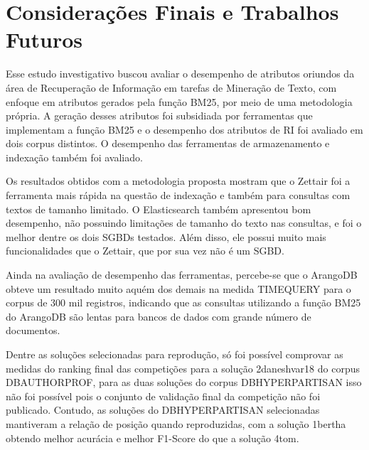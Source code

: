 \chapter{Considerações Finais e Trabalhos Futuros} \label{ch:ConsideraçõesFinais}

Esse estudo investigativo buscou avaliar o desempenho de atributos oriundos da área de Recuperação de Informação em tarefas de Mineração de Texto, com enfoque em atributos gerados pela função BM25, por meio de uma metodologia própria.
A geração desses atributos foi subsidiada por ferramentas que implementam a função BM25 e o desempenho dos atributos de RI foi avaliado em dois corpus distintos.
O desempenho das ferramentas de armazenamento e indexação também foi avaliado.
 
Os resultados obtidos com a metodologia proposta mostram que o Zettair foi a ferramenta mais rápida na questão de indexação e também para consultas com textos de tamanho limitado.
O Elasticsearch também apresentou bom desempenho, não possuindo limitações de tamanho do texto nas consultas, e foi o melhor dentre os dois SGBDs testados.
Além disso, ele possui muito mais funcionalidades que o Zettair, que por sua vez não é um SGBD.

Ainda na avaliação de desempenho das ferramentas, percebe-se que o ArangoDB obteve um resultado muito aquém dos demais na medida TIME\underscore{}QUERY para o corpus de 300 mil registros, indicando que as consultas utilizando a função BM25 do ArangoDB são lentas para bancos de dados com grande número de documentos.

Dentre as soluções selecionadas para reprodução, só foi possível comprovar as medidas do ranking final das competições para a solução 2\underscore{}daneshvar18 do corpus DB\underscore{}AUTHORPROF, para as duas soluções do corpus DB\underscore{}HYPERPARTISAN isso não foi possível pois o conjunto de validação final da competição não foi publicado.
Contudo, as soluções do DB\underscore{}HYPERPARTISAN selecionadas mantiveram a relação de posição quando reproduzidas, com a solução 1\underscore{}bertha obtendo melhor acurácia e melhor F1-Score do que a solução 4\underscore{}tom.

